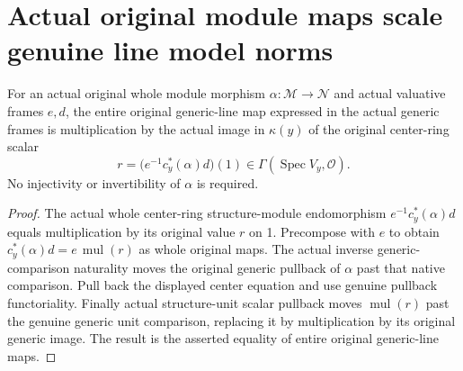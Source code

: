 \section{Actual original module maps scale genuine line model norms}

\begin{lemma}
\label{lem:scheme-line-actual-model-hom-scalar}
\leanok
{}
For an actual original whole module morphism
$\alpha:\mathcal M\to\mathcal N$ and actual valuative frames $e,d$,
the entire original generic-line map expressed in the actual generic
frames is multiplication by the actual image in $\kappa(y)$ of the
original center-ring scalar
\[
 r=\bigl(e^{-1}c_y^*(\alpha)d\bigr)(1)
   \in\Gamma(\operatorname{Spec}V_y,\mathcal O).
\]
No injectivity or invertibility of $\alpha$ is required.
\end{lemma}
\begin{proof}
The actual whole center-ring structure-module endomorphism
$e^{-1}c_y^*(\alpha)d$ equals multiplication by its original value
$r$ on 1. Precompose with $e$ to obtain
$c_y^*(\alpha)d=e\,\operatorname{mul}(r)$ as whole original maps.
The actual inverse generic-comparison naturality moves the original
generic pullback of $\alpha$ past that native comparison. Pull back
the displayed center equation and use genuine pullback functoriality.
Finally actual structure-unit scalar pullback moves
$\operatorname{mul}(r)$ past the genuine generic unit comparison,
replacing it by multiplication by its original generic image. The
result is the asserted equality of entire original generic-line maps.
\end{proof}


